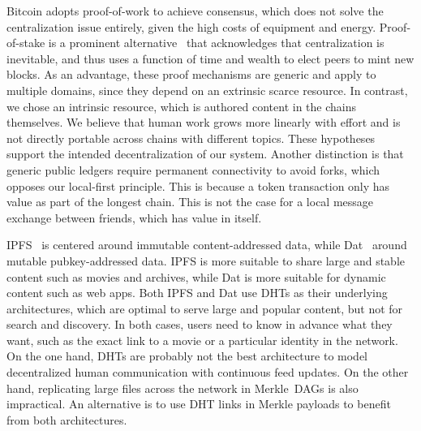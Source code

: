 \documentclass[10pt,journal,compsoc]{IEEEtran}
\begin{document}
Bitcoin adopts proof-of-work to achieve consensus, which does not solve the
centralization issue entirely, given the high costs of equipment and energy.
Proof-of-stake is a prominent alternative~\cite{p2p.proofs} that acknowledges
that centralization is inevitable, and thus uses a function of time and wealth
to elect peers to mint new blocks.
As an advantage, these proof mechanisms are generic and apply to multiple
domains, since they depend on an extrinsic scarce resource.
In contrast, we chose an intrinsic resource, which is authored content in the
chains themselves.
We believe that human work grows more linearly with effort and is not directly
portable across chains with different topics.
These hypotheses support the intended decentralization of our system.
%
Another distinction is that generic public ledgers require permanent
connectivity to avoid forks, which opposes our local-first principle.
This is because a token transaction only has value as part of the longest
chain.
This is not the case for a local message exchange between friends, which has
value in itself.

IPFS~\cite{p2p.ipfs} is centered around immutable content-addressed data, while
Dat~\cite{p2p.dat} around mutable pubkey-addressed data.
IPFS is more suitable to share large and stable content such as movies and
archives, while Dat is more suitable for dynamic content such as web apps.
%
Both IPFS and Dat use DHTs as their underlying architectures, which are optimal
to serve large and popular content, but not for search and discovery.
In both cases, users need to know in advance what they want, such as the exact
link to a movie or a particular identity in the network.
%
On the one hand, DHTs are probably not the best architecture to model
decentralized human communication with continuous feed updates.
On the other hand, replicating large files across the network in Merkle~DAGs is
also impractical.
An alternative is to use DHT links in Merkle payloads to benefit from both
architectures.
\end{document}
